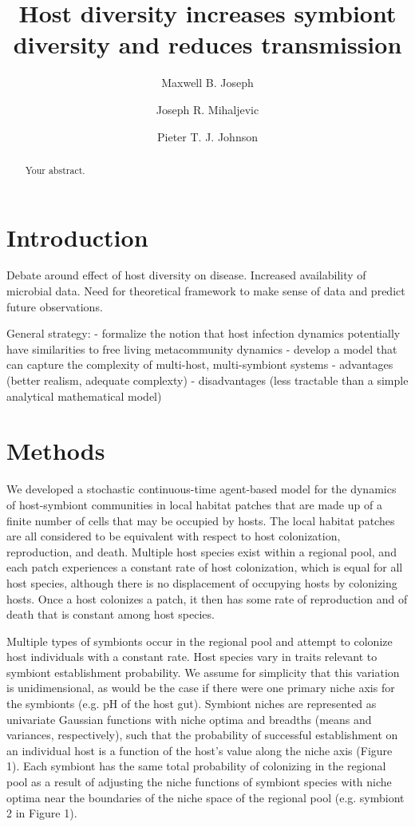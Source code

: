 \documentclass[12pt]{article}
\title{Host diversity increases symbiont diversity and reduces transmission}
\author[1]{Maxwell B. Joseph}
\author[2]{Joseph R. Mihaljevic}
\author[1]{Pieter T. J. Johnson}
\affil[1]{Ecology and Evolutionary Biology, University of Colorado, Boulder}
\affil[2]{Ecology and Evolution, University of Chicago}
\date{}
\begin{document}
\maketitle

\begin{abstract}
Your abstract.
\end{abstract}

\section{Introduction}

Debate around effect of host diversity on disease. 
Increased availability of microbial data. 
Need for theoretical framework to make sense of data and predict future observations.

General strategy: 
- formalize the notion that host infection dynamics potentially have similarities to free living metacommunity dynamics
- develop a model that can capture the complexity of multi-host, multi-symbiont systems
- advantages (better realism, adequate complexty)
- disadvantages (less tractable than a simple analytical mathematical model)

\section{Methods}

We developed a stochastic continuous-time agent-based model for the dynamics of host-symbiont communities in local habitat patches that are made up of a finite number of cells that may be occupied by hosts. 
The local habitat patches are all considered to be equivalent with respect to host colonization, reproduction, and death. 
Multiple host species exist within a regional pool, and each patch experiences a constant rate of host colonization, which is equal for all host species, although there is no displacement of occupying hosts by colonizing hosts. 
Once a host colonizes a patch, it then has some rate of reproduction and of death that is constant among host species.

Multiple types of symbionts occur in the regional pool and attempt to colonize host individuals with a constant rate. 
Host species vary in traits relevant to symbiont establishment probability. 
We assume for simplicity that this variation is unidimensional, as would be the case if there were one primary niche axis for the symbionts (e.g. pH of the host gut). 
Symbiont niches are represented as univariate Gaussian functions with niche optima and breadths (means and variances, respectively), such that the probability of successful establishment on an individual host is a function of the host's value along the niche axis (Figure 1). 
Each symbiont has the same total probability of colonizing in the regional pool as a result of adjusting the niche functions of symbiont species with niche optima near the boundaries of  the niche space of the regional pool (e.g. symbiont 2 in Figure 1).
\end{document}
